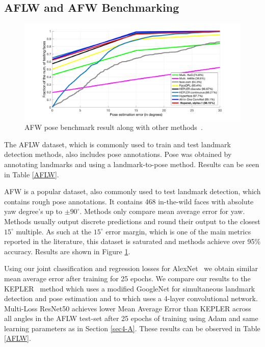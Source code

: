 \documentclass[10pt,twocolumn,letterpaper]{article}
\begin{document}
\subsection{AFLW and AFW Benchmarking}\label{sec4-E}
\begin{figure}[t]
\begin{center}
   \includegraphics[width=1\linewidth]{afw_pose}
\end{center}
   \caption{AFW pose benchmark result along with other methods~\cite{allinone,ranjan2016hyperface,KEPLER,zhu2012face}.}
   \label{afw_pose}
\end{figure}
The AFLW dataset, which is commonly used to train and test landmark detection methods, also includes pose annotations. Pose was obtained by annotating landmarks and using a landmark-to-pose method. Results can be seen in Table \ref{AFLW}.

AFW is a popular dataset, also commonly used to test landmark detection, which contains rough pose annotations. It contains 468 in-the-wild faces with absolute yaw degree's up to $\pm 90^\circ$. Methods only compare mean average error for yaw. Methods usually output discrete predictions and round their output to the closest $15^\circ$ multiple. As such at the $15^\circ$ error margin, which is one of the main metrics reported in the literature, this dataset is saturated and methods achieve over 95\% accuracy. Results are shown in Figure \ref{afw_pose}.

Using our joint classification and regression losses for AlexNet~\cite{krizhevsky2012imagenet} we obtain similar mean average error after training for 25 epochs. We compare our results to the KEPLER~\cite{KEPLER} method which uses a modified GoogleNet for simultaneous landmark detection and pose estimation and to \cite{patacchiola2017head} which uses a 4-layer convolutional network. Multi-Loss ResNet50 achieves lower Mean Average Error than KEPLER across all angles in the AFLW test-set after 25 epochs of training using Adam and same learning parameters as in Section \ref{sec4-A}. These results can be observed in Table \ref{AFLW}.
\end{document}
